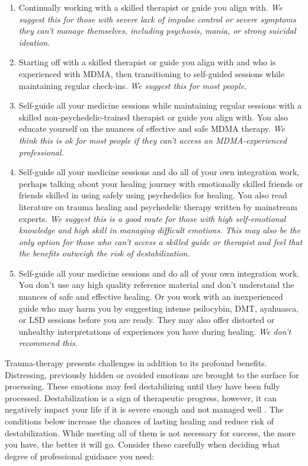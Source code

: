 \documentclass[12pt,letterpaper]{article}
\begin{document}
\begin{enumerate}
    \item Continually working with a skilled therapist or guide you align with. \textit{We suggest this for those with severe lack of impulse control or severe symptoms they can't manage themselves, including psychosis, mania, or strong suicidal ideation.}
    \item Starting off with a skilled therapist or guide you align with and who is experienced with MDMA, then transitioning to self-guided sessions while maintaining regular check-ins. \textit{We suggest this for most people.}
    \item Self-guide all your medicine sessions while maintaining regular sessions with a skilled non-psychedelic-trained therapist or guide you align with. You also educate yourself on the nuances of effective and safe MDMA therapy. \textit{We think this is ok for most people if they can't access an MDMA-experienced professional.}
    \item Self-guide all your medicine sessions and do all of your own integration work, perhaps talking about your healing journey with emotionally skilled friends or friends skilled in using safely using psychedelics for healing. You also read literature on trauma healing and psychedelic therapy written by mainstream experts. \textit{We suggest this is a good route for those with high self-emotional knowledge and high skill in managing difficult emotions. This may also be the only option for those who can't access a skilled guide or therapist and feel that the benefits outweigh the risk of destabilization.} 
    \item Self-guide all your medicine sessions and do all of your own integration work. You don't use any high quality reference material and don't understand the nuances of safe and effective healing. Or you work with an inexperienced guide who may harm you by suggesting intense psilocybin, DMT, ayahuasca, or LSD sessions before you are ready. They may also offer distorted or unhealthy interpretations of experiences you have during healing. \textit{We don't recommend this.} 
\end{enumerate}
Trauma-therapy presents challenges in addition to its profound benefits. Distressing, previously hidden or avoided emotions are brought to the surface for processing. These emotions may feel destabilizing until they have been fully processed. Destabilization is a sign of therapeutic progress, however, it can negatively impact your life if it is severe enough and not managed well \cite{olthofDestabilization}. The conditions below increase the chances of lasting healing and reduce risk of destabilization. While meeting all of them is not necessary for success, the more you have, the better it will go. Consider these carefully when deciding what degree of professional guidance you need:  
\end{document}
